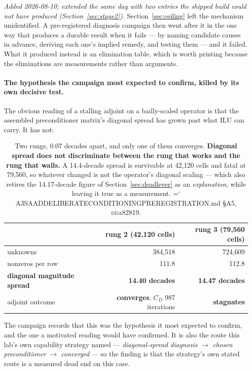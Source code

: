 \documentclass[11pt,a4paper]{article}
\newcommand{\artifact}[1]{{\small\ttfamily\hyphenchar\font=`\-\relax
  \def\_{\textunderscore\allowbreak}#1}}
\newcommand{\commit}[1]{\textsc{\small #1}}
\begin{document}
\emph{Added 2026-08-10; extended the same day with two entries the shipped build could not have
produced (Section~\ref{sec:stage2}).} Section~\ref{sec:ceiling} left the mechanism unidentified. A
pre-registered diagnosis campaign then went after it in the one way that produces a durable
result when it fails --- by naming candidate causes in advance, deriving each one's implied
remedy, and testing them --- and it failed. What it produced instead is an elimination table,
which is worth printing because the eliminations are measurements rather than arguments.

\paragraph{The hypothesis the campaign most expected to confirm, killed by its own decisive
test.} The obvious reading of a stalling adjoint on a badly-scaled operator is that the
assembled preconditioner matrix's diagonal spread has grown past what ILU can carry. It has
not:

\begin{table}[htbp]
\centering\footnotesize
\begin{tabular}{@{}lrr@{}}
\toprule
 & rung 2 (42{,}120 cells) & rung 3 (79{,}560 cells) \\
\midrule
unknowns & 384{,}518 & 724{,}609 \\
nonzeros per row & 111.8 & 112.8 \\
\textbf{diagonal magnitude spread} & \textbf{14.40 decades} & \textbf{14.47 decades} \\
adjoint outcome & \textbf{converges}, \(C_D\) 987 iterations & \textbf{stagnates} \\
\bottomrule
\end{tabular}
\caption{Two rungs, 0.07 decades apart, and only one of them converges. \textbf{Diagonal
spread does not discriminate between the rung that works and the rung that walls.} A
14.4-decade spread is survivable at 42{,}120 cells and fatal at 79{,}560, so whatever changed
is not the operator's diagonal scaling --- which also retires the 14.17-decade figure of
Section~\ref{sec:deadlever} as an \emph{explanation}, while leaving it true as a measurement.
\artifact{A3\_SAAD\_DELIBERATE\_CONDITIONING\_PREREGISTRATION.md} \S A5, \commit{dda82819}.}
\label{tab:spread}
\end{table}

The campaign records that this was the hypothesis it most expected to confirm, and the one a
motivated reading would have confirmed. It is also the route this lab's own capability strategy
named --- \emph{diagonal-spread diagnosis \(\rightarrow\) chosen preconditioner \(\rightarrow\)
converged} --- so the finding is that the strategy's own stated route is a measured dead end on
this case.
\end{document}

